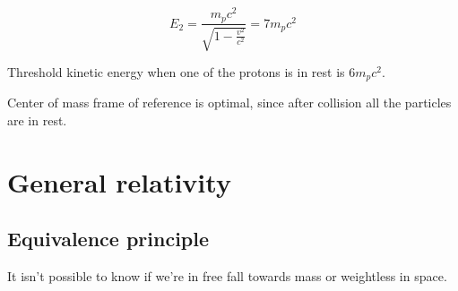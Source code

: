 $$E_2 = \frac{m_pc^2}{\sqrt{1-\frac{v^2}{c^2}}}=7m_pc^2$$

Threshold kinetic energy when one of the protons is in rest is $6m_pc^2$.

Center of mass frame of reference is optimal, since after collision all the particles are in rest.

\section{General relativity}
\subsection{Equivalence principle}
It isn't possible to know if we're in free fall towards mass or weightless in space.